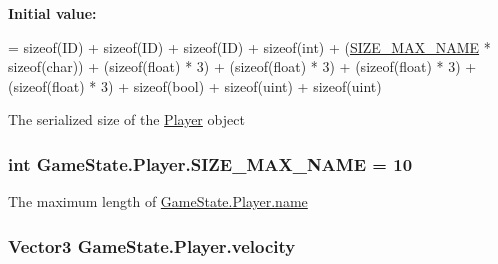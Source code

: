 {\bfseries Initial value\-:}
\begin{DoxyCode}
=
            \textcolor{keyword}{sizeof}(ID) 
            + \textcolor{keyword}{sizeof}(ID) 
            + \textcolor{keyword}{sizeof}(ID) 
            + \textcolor{keyword}{sizeof}(\textcolor{keywordtype}{int}) + (\hyperlink{class_game_state_1_1_player_a1cdc9de8183b220e87632f7f6a7147d0}{SIZE\_MAX\_NAME} * \textcolor{keyword}{sizeof}(char))
            + (\textcolor{keyword}{sizeof}(float) * 3) 
            + (\textcolor{keyword}{sizeof}(float) * 3) 
            + (\textcolor{keyword}{sizeof}(float) * 3) 
            + (\textcolor{keyword}{sizeof}(float) * 3) 
            + \textcolor{keyword}{sizeof}(bool) 
            + \textcolor{keyword}{sizeof}(uint) 
            + \textcolor{keyword}{sizeof}(uint)
\end{DoxyCode}


The serialized size of the \hyperlink{class_game_state_1_1_player}{Player} object 

\hypertarget{class_game_state_1_1_player_a1cdc9de8183b220e87632f7f6a7147d0}{
\subsubsection[{S\-I\-Z\-E\-\_\-\-M\-A\-X\-\_\-\-N\-A\-M\-E}]{\setlength{\rightskip}{0pt plus 5cm}int Game\-State.\-Player.\-S\-I\-Z\-E\-\_\-\-M\-A\-X\-\_\-\-N\-A\-M\-E = 10\hspace{0.3cm}{\ttfamily [static]}}}\label{class_game_state_1_1_player_a1cdc9de8183b220e87632f7f6a7147d0}


The maximum length of \hyperlink{class_game_state_1_1_player_afc2b145df544ca5bffc7c87ef294bcde}{Game\-State.\-Player.\-name} 

\hypertarget{class_game_state_1_1_player_aa22122c85cfdae428d82bd1571ab022a}{
\subsubsection[{velocity}]{\setlength{\rightskip}{0pt plus 5cm}Vector3 Game\-State.\-Player.\-velocity}}\label{class_game_state_1_1_player_aa22122c85cfdae428d82bd1571ab022a}


